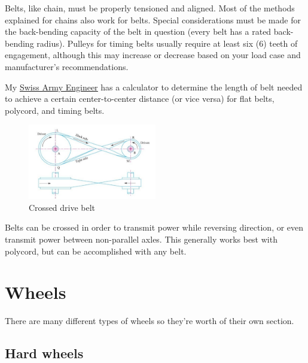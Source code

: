 \documentclass[10pt,letterpaper]{book}
\begin{document}
Belts, like chain, must be properly tensioned and aligned. Most of the methods explained for chains also work for belts. Special considerations must be made for the back-bending capacity of the belt in question (every belt has a rated back-bending radius). Pulleys for timing belts usually require at least six (6) teeth of engagement, although this may increase or decrease based on your load case and manufacturer's recommendations. 

My \href{http://thaddeus-maximus.github.io/swissarmyengineer/}{\color{red}\underline{Swiss Army Engineer}} has a calculator to determine the length of belt needed to achieve a certain center-to-center distance (or vice versa) for flat belts, polycord, and timing belts.

\begin{figure}[H]
	\includegraphics[width=0.5\textwidth]{imgs/belt_crossed.png}
	\caption{Crossed drive belt}
\end{figure}
	Belts can be crossed in order to transmit power while reversing direction, or even transmit power between non-parallel axles. This generally works best with polycord, but can be accomplished with any belt.
	
	
\section{Wheels} \label{section:wheels}
	There are many different types of wheels so they're worth of their own section.
	
	\subsection{Hard wheels}
	
\end{document}
